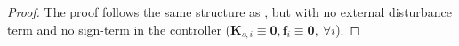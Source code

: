 \documentclass[../main.tex]{subfiles}
\begin{document}
\begin{proof}
    The proof follows the same structure as , but with no external disturbance term and no sign-term in the controller ($\bm{K}_{s,i} \equiv \bm{0}, \bm{f}_i \equiv \bm{0}, \ \forall i $).
\end{proof}

\end{document}
